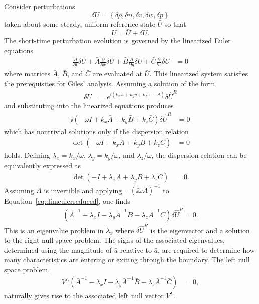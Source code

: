 Consider perturbations
\[
\delta{}U = \left\{ \delta{}\rho, \delta{}u,
\delta{}v, \delta{}w, \delta{}p \right\}
\]
taken about some steady,
uniform reference state $\bar{U}$ so that
\[
U = \bar{U} + \delta{}U.
\]
The short-time perturbation evolution is governed by the linearized
Euler equations
\begin{align}
\label{eq:dimeulerperturb}
               \frac{\partial\!}{\partial\!t}\delta{}U
+ \bar{A} \frac{\partial\!}{\partial\!x}\delta{}U
+ \bar{B} \frac{\partial\!}{\partial\!y}\delta{}U
+ \bar{C} \frac{\partial\!}{\partial\!z}\delta{}U
&= 0
\end{align}
where matrices $\bar{A}$, $\bar{B}$, and $\bar{C}$ are evaluated
at $\bar{U}$.  This linearized system satisfies the prerequisites for
Giles' analysis.  Assuming a solution of the form
\begin{align}
  \delta{}U &= e^{\ii\left(
    k_x x + k_y y + k_z z - \omega t
  \right)}
  \delta\hat{U}^R
\end{align}
and substituting into the linearized equations produces
\begin{align}
\label{eq:dimeulerreduced}
  \ii\left( - \omega I
            + k_x \bar{A}
            + k_y \bar{B}
            + k_z \bar{C}
  \right)
  \delta\hat{U}^R &= 0
\end{align}
which has nontrivial solutions only if the dispersion relation
\begin{align}
  \det \left( - \omega I
              + k_x \bar{A}
              + k_y \bar{B}
              + k_z \bar{C}
       \right) &= 0
\end{align}
holds.  Defining $\lambda_x = k_x/\omega$, $\lambda_y = k_y/\omega$, and
$\lambda_z/\omega$, the dispersion relation can be equivalently expressed as
\begin{align}
\label{eq:dimeulerdisp}
  \det \left( - I
              + \lambda_x \bar{A}
              + \lambda_y \bar{B}
              + \lambda_z \bar{C}
       \right) &= 0.
\end{align}
Assuming $\bar{A}$ is invertible and applying
$-\left(\ii\omega{}\bar{A}\right)^{-1}$ to
Equation~\eqref{eq:dimeulerreduced}, one finds
\begin{align}
  \left(   \bar{A}^{-1}
         - \lambda_x I
         - \lambda_y \bar{A}^{-1} \bar{B}
         - \lambda_z \bar{A}^{-1} \bar{C}
  \right) \delta\hat{U}^R = 0.
\end{align}
This is an eigenvalue problem in $\lambda_x$
where $\delta\hat{U}^R$ is the eigenvector and a solution to the right null
space problem.  The signs of the associated eigenvalues, determined using the
magnitude of $\bar{u}$ relative to $\bar{a}$, are required to determine how
many characteristics are entering or exiting through the boundary.  The left
null space problem,
\begin{align}
\label{eq:dimeulereigenprob}
  V^{L}
  \left(   \bar{A}^{-1}
         - \lambda_x I
         - \lambda_y \bar{A}^{-1} \bar{B}
         - \lambda_z \bar{A}^{-1} \bar{C}
  \right) &= 0,
\end{align}
naturally gives rise to the associated left null vector $V^L$.

